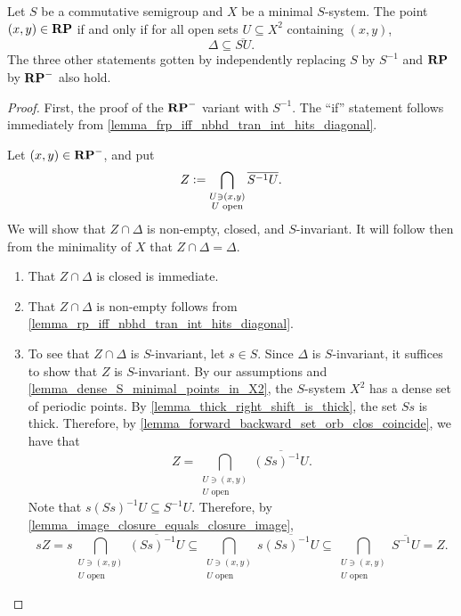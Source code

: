 \begin{lemma}
\label{lemma_frp_iff_nbhd_tran_int_contains_diagonal}
\label{lemma_rp_iff_nbhd_tran_int_contains_diagonal}
    Let $S$ be a commutative semigroup and $X$ be a minimal $S$-system.  The point $(x,y) \in \mathbf{RP}$ if and only if for all open sets $U \subseteq X^2$ containing $(x,y)$,
    \[\Delta \subseteq \overline{S U}.\]
    The three other statements gotten by independently replacing $S$ by $S^{-1}$ and $\mathbf{RP}$ by $\mathbf{RP}^-$ also hold.
\end{lemma}

\begin{proof}
    First, the proof of the $\mathbf{RP}^-$ variant with $S^{-1}$.  The ``if'' statement follows immediately from \cref{lemma_frp_iff_nbhd_tran_int_hits_diagonal}.

    
    Let $(x,y) \in \mathbf{RP}^-$, and put
    \[Z \vcentcolon= \bigcap_{\substack{U \ni (x,y) \\ U \text{ open}}} \overline{S^{-1} U}.\]
    We will show that $Z \cap \Delta$ is non-empty, closed, and $S$-invariant.  It will follow then from the minimality of $X$ that $Z \cap \Delta = \Delta$.

    \begin{enumerate}
        \item That $Z \cap \Delta$ is closed is immediate.

        \item That $Z \cap \Delta$ is non-empty follows from \cref{lemma_rp_iff_nbhd_tran_int_hits_diagonal}.

        \item To see that $Z \cap \Delta$ is $S$-invariant, let $s \in S$.  Since $\Delta$ is $S$-invariant, it suffices to show that $Z$ is $S$-invariant.  By our assumptions and \cref{lemma_dense_S_minimal_points_in_X2}, the $S$-system $X^2$ has a dense set of periodic points.  By \cref{lemma_thick_right_shift_is_thick}, the set $Ss$ is thick. Therefore, by \cref{lemma_forward_backward_set_orb_clos_coincide}, we have that
        \[Z = \bigcap_{\substack{U \ni (x,y) \\ U \text{ open}}} \overline{(Ss)^{-1} U}.\]
        Note that $s(Ss)^{-1} U \subseteq S^{-1} U$.
        Therefore, by \cref{lemma_image_closure_equals_closure_image},
        \[
            sZ = s\bigcap_{\substack{U \ni (x,y) \\ U \text{ open}}} \overline{(Ss)^{-1} U} \subseteq \bigcap_{\substack{U \ni (x,y) \\ U \text{ open}}} s \overline{(Ss)^{-1} U} \subseteq \bigcap_{\substack{U \ni (x,y) \\ U \text{ open}}} \overline{S^{-1} U} = Z.
        \]
    \end{enumerate}


\end{proof}
